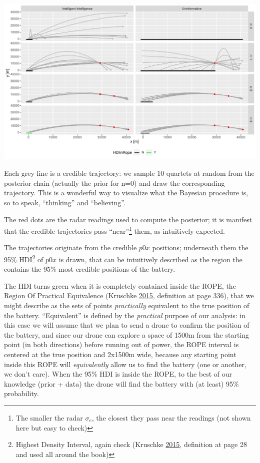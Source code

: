 \documentclass[]{article}
\begin{document}
\begin{center}\includegraphics[width=1.0\textwidth]{bayesian_artillery_files/figure-latex/plot_full-1} \end{center}

Each grey line is a credible trajectory: we sample 10 quartets at random
from the posterior chain (actually the prior for n=0) and draw the
corresponding trajectory. This is a wonderful way to visualize what the
Bayesian procedure is, so to speak, ``thinking'' and ``believing''.

The red dots are the radar readings used to compute the posterior; it is
manifest that the credible trajectories pass ``near''\footnote{The
  smaller the radar \(\sigma_e\), the closest they pass near the
  readings (not shown here but easy to check)} them, as intuitively
expected.

The trajectories originate from the credible \(p0x\) positions;
underneath them the 95\% HDI\footnote{Highest Density Interval, again
  check (Kruschke \protect\hyperlink{ref-DBDA2E}{2015}, definition at
  page 28 and used all around the book)} of \(p0x\) is drawn, that can
be intuitively described as the region the contains the 95\% most
credible positions of the battery.

The HDI turns green when it is completely contained inside the ROPE, the
Region Of Practical Equivalence (Kruschke
\protect\hyperlink{ref-DBDA2E}{2015}, definition at page 336), that we
might describe as the sets of points \emph{practically} equivalent to
the true position of the battery. ``Equivalent'' is defined by the
\emph{practical} purpose of our analysis: in this case we will assume
that we plan to send a drone to confirm the position of the battery, and
since our drone can explore a space of 1500m from the starting point (in
both directions) before running out of power, the ROPE interval is
centered at the true position and 2x1500m wide, because any starting
point inside this ROPE will \emph{equivalently} allow us to find the
battery (one or another, we don't care). When the 95\% HDI is inside the
ROPE, to the best of our knowledge (prior + data) the drone will find
the battery with (at least) 95\% probability.
\end{document}

